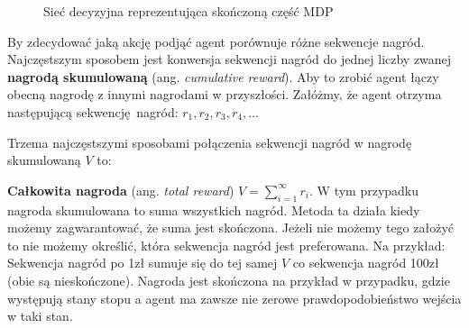 \documentclass[a4paper, 12pt,oneside]{book}
\begin{document}
\begin{figure}[!htb]
\begin{center}
\caption{Sieć decyzyjna reprezentująca skończoną część MDP}
\label{markov_decision_process}
\end{center}
\end{figure}

By zdecydować jaką akcję podjąć agent porównuje różne sekwencje nagród.
Najczęstszym sposobem jest konwersja sekwencji nagród do jednej liczby zwanej
\textbf{nagrodą skumulowaną} (ang. \textit{cumulative reward}). Aby to zrobić
agent łączy obecną nagrodę z innymi nagrodami w przyszłości. Załóżmy, że agent
otrzyma następującą sekwencję nagród: $r_1, r_2, r_3, r_4, \dots$

Trzema najczęstszymi sposobami połączenia sekwencji nagród w nagrodę
skumulowaną $V$ to:

\textbf{Całkowita nagroda} (ang. \textit{total reward}) $V =
\sum_{i=1}^{\infty} r_i$. W tym przypadku nagroda skumulowana to suma
wszystkich nagród. Metoda ta działa kiedy możemy zagwarantować, że suma jest
skończona. Jeżeli nie możemy tego założyć to nie możemy określić, która
sekwencja nagród jest preferowana. Na przykład: Sekwencja nagród po 1zł sumuje
się do tej samej $V$ co sekwencja nagród 100zł (obie są nieskończone). Nagroda
jest skończona na przykład w przypadku, gdzie występują stany stopu a agent ma
zawsze nie zerowe prawdopodobieństwo wejścia w taki stan.
\end{document}
